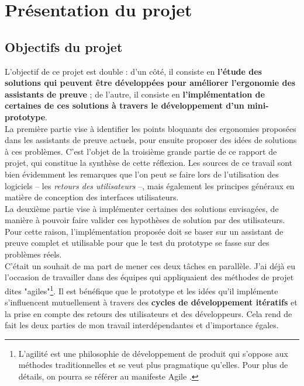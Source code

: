 \section{Présentation du projet}

\subsection{Objectifs du projet}

L'objectif de ce projet est double : d'un côté, il consiste en \textbf{l'étude des solutions qui peuvent être développées pour améliorer l'ergonomie des assistants de preuve} ; de l'autre, il consiste en \textbf{l'implémentation de certaines de ces solutions à travers le développement d'un mini-prototype}.\\

La première partie vise à identifier les points bloquants des ergonomies proposées dans les assistants de preuve actuels, pour ensuite proposer des idées de solutions à ces problèmes. C'est l'objet de la troisième grande partie de ce rapport de projet, qui constitue la synthèse de cette réflexion. Les sources de ce travail sont bien évidemment les remarques que l'on peut se faire lors de l'utilisation des logiciels -- les \textit{retours des utilisateurs} --, mais également les principes généraux en matière de conception des interfaces utilisateurs.\\

La deuxième partie vise à implémenter certaines des solutions envisagées, de manière à pouvoir faire valider ces hypothèses de solution par des utilisateurs. Pour cette raison, l'implémentation proposée doit se baser sur un assistant de preuve complet et utilisable pour que le test du prototype se fasse sur des problèmes réels.\\

C'était un souhait de ma part de mener ces deux tâches en parallèle. J'ai déjà eu l'occasion de travailler dans des équipes qui appliquaient des méthodes de projet dites "agiles"\footnote{L'agilité est une philosophie de développement de produit qui s'oppose aux méthodes traditionnelles et se veut plus pragmatique qu'elles. Pour plus de détails, on pourra se référer au manifeste Agile \cite{alliance2001agile}.}. Il est bénéfique que le prototype et les idées qu'il implémente s'influencent mutuellement à travers des \textbf{cycles de développement itératifs} et la prise en compte des retours des utilisateurs et des développeurs. Cela rend de fait les deux parties de mon travail interdépendantes et d'importance égales.

